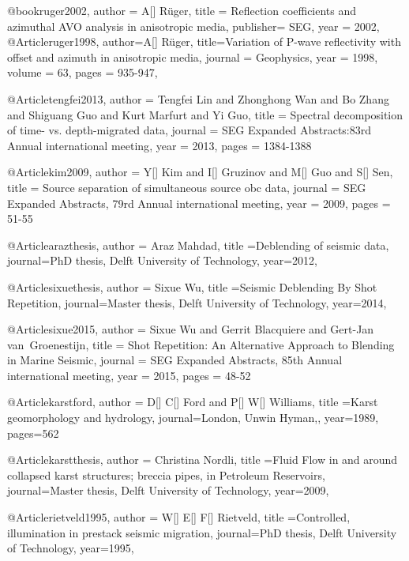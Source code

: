 @book{ruger2002,
  author = 	 {A[] R\"{u}ger},
  title  = 	 {Reflection coefficients and azimuthal AVO analysis in anisotropic media},
  publisher= 	 {SEG},
  year   = 	 2002,
}
@Article{ruger1998,
  author={A[] R\"{u}ger},
  title={Variation of P-wave reflectivity with offset and azimuth in anisotropic media},
  journal = 	 {Geophysics},
  year = 	 1998,
  volume =	 63,
  pages =	 {935-947},
}

@Article{tengfei2013,
  author = 	 {Tengfei Lin and Zhonghong Wan and Bo Zhang and Shiguang Guo and Kurt Marfurt and Yi Guo},
  title = 	 {Spectral decomposition of time- vs. depth-migrated data},
  journal = 	 {SEG Expanded Abstracts:83rd Annual international meeting},
  year = 	 2013,
  pages =	 {1384-1388}
}

@Article{kim2009,
  author = 	 {Y[] Kim and I[] Gruzinov and M[] Guo and S[] Sen},
  title = 	 {Source separation of simultaneous source obc data},
  journal = 	 {SEG Expanded Abstracts, 79rd Annual international meeting},
  year = 	 2009,
  pages =	 {51-55}
}

@Article{arazthesis,
  author = {Araz Mahdad},
  title ={Deblending of seismic data},
  journal={PhD thesis, Delft University of Technology},
  year=2012,
}



@Article{sixuethesis,
  author = {Sixue Wu},
  title ={Seismic Deblending By Shot Repetition},
  journal={Master thesis, Delft University of Technology},
  year=2014,
}

@Article{sixue2015,
  author = 	 {Sixue Wu and Gerrit Blacquiere and Gert-Jan van~Groenestijn},
  title = 	 {Shot Repetition: An Alternative Approach to Blending in Marine Seismic},
  journal = 	 {SEG Expanded Abstracts, 85th Annual international meeting},
  year = 	 2015,
  pages =	 {48-52}
}



@Article{karstford,
  author = {D[] C[] Ford and P[] W[] Williams},
  title ={Karst geomorphology and hydrology},
  journal={London, Unwin Hyman,},
  year=1989,
  pages={562}
}

@Article{karstthesis,
  author = {Christina Nordli},
  title ={Fluid Flow in and around collapsed karst structures; breccia pipes, in
Petroleum Reservoirs},
  journal={Master thesis, Delft University of Technology},
  year=2009,
}


@Article{rietveld1995,
  author = {W[] E[] F[] Rietveld},
  title ={Controlled, illumination in prestack seismic migration},
  journal={PhD thesis, Delft University of Technology},
  year=1995,
}

